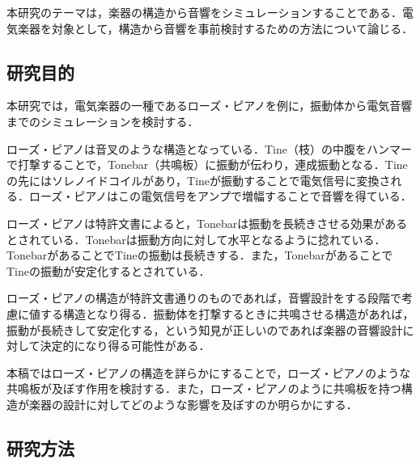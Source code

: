本研究のテーマは，楽器の構造から音響をシミュレーションすることである．電気楽器を対象として，構造から音響を事前検討するための方法について論じる．

\subsection{研究目的}

本研究では，電気楽器の一種であるローズ・ピアノを例に，振動体から電気音響までのシミュレーションを検討する．

ローズ・ピアノは音叉のような構造となっている．Tine（枝）の中腹をハンマーで打撃することで，Tonebar（共鳴板）に振動が伝わり，連成振動となる．Tineの先にはソレノイドコイルがあり，Tineが振動することで電気信号に変換される．ローズ・ピアノはこの電気信号をアンプで増幅することで音響を得ている．

ローズ・ピアノは特許文書によると，Tonebarは振動を長続きさせる効果があるとされている．Tonebarは振動方向に対して水平となるように捻れている．TonebarがあることでTineの振動は長続きする．また，TonebarがあることでTineの振動が安定化するとされている．

ローズ・ピアノの構造が特許文書通りのものであれば，音響設計をする段階で考慮に値する構造となり得る．振動体を打撃するときに共鳴させる構造があれば，振動が長続きして安定化する，という知見が正しいのであれば楽器の音響設計に対して決定的になり得る可能性がある．

本稿ではローズ・ピアノの構造を詳らかにすることで，ローズ・ピアノのような共鳴板が及ぼす作用を検討する．また，ローズ・ピアノのように共鳴板を持つ構造が楽器の設計に対してどのような影響を及ぼすのか明らかにする．

\subsection{研究方法}


